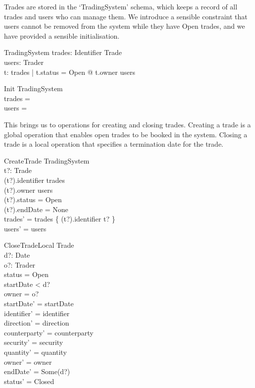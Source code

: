 \documentclass{article}
\begin{document}
\hspace{-0.7cm} Trades are stored in the ‘TradingSystem’ schema, which keeps a record of all trades and users who can manage them. We introduce a sensible constraint that users cannot be removed from the system while they have Open trades, and we have provided a sensible initialisation.
\begin{schema}{TradingSystem}
trades: Identifier \pfun Trade \\
users: \finset Trader \\
\where
\forall t: \ran trades | t.status = Open @ t.owner \in users 
\end{schema}

\vspace{-0.2cm}

\begin{schema}{Init}
TradingSystem \\
\where
trades = \emptyset \\
users = \emptyset \\
\end{schema}

\hspace{-0.7cm} This brings us to operations for creating and closing trades. Creating a trade is a global operation that enables open trades to be booked in the system. Closing a trade is a local operation that specifies a termination date for the trade.

\begin{schema}{CreateTrade}
\Delta TradingSystem \\
t?: Trade \\
\where 
(t?).identifier \notin \dom trades \\
(t?).owner \in users \\
(t?).status = Open \\ 
(t?).endDate = None \\
trades' = trades \cup \{ (t?).identifier \mapsto t? \} \\
users' = users \\
\end{schema}

\begin{schema}{CloseTradeLocal}
\Delta Trade \\
d?: Date \\ 
o?: Trader \\
\where
status = Open \\ 
startDate < d? \\
owner = o? \\
startDate' = startDate \\
identifier' = identifier \\
direction' = direction \\
counterparty' = counterparty \\
security' = security \\
quantity' = quantity \\
owner' =  owner \\
endDate' = Some(d?) \\ 
status' = Closed \\
\end{schema}
\end{document}

